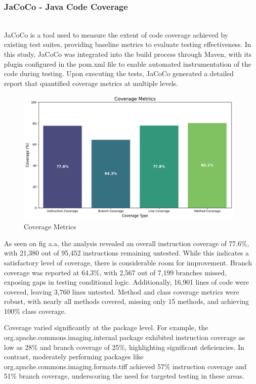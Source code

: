 \documentclass[sigconf]{acmart}
\begin{document}
\subsubsection{JaCoCo - Java Code Coverage}
\hfill\\
JaCoCo is a tool used to measure the extent of code coverage achieved by existing test suites, providing baseline metrics to evaluate testing effectiveness. In this study, JaCoCo was integrated into the build process through Maven, with its plugin configured in the pom.xml file to enable automated instrumentation of the code during testing. Upon executing the tests, JaCoCo generated a detailed report that quantified coverage metrics at multiple levels.

\begin{figure}[h!]
    \centering
    \includegraphics[width=1\linewidth]{Coverage_Metrics.png}
    \caption{Coverage Metrics}
    \label{fig:enter-label}
\end{figure}

As seen on fig a.a, the analysis revealed an overall instruction coverage of 77.6\%, with 21,380 out of 95,452 instructions remaining untested. While this indicates a satisfactory level of coverage, there is considerable room for improvement. Branch coverage was reported at 64.3\%, with 2,567 out of 7,199 branches missed, exposing gaps in testing conditional logic. Additionally, 16,901 lines of code were covered, leaving 3,760 lines untested. Method and class coverage metrics were robust, with nearly all methods covered, missing only 15 methods, and achieving 100\% class coverage.

Coverage varied significantly at the package level. For example, the org.apache.commons.imaging.internal package exhibited instruction coverage as low as 28\% and branch coverage of 25\%, highlighting significant deficiencies. In contrast, moderately performing packages like org.apache.commons.imaging.formats.tiff achieved 57\% instruction coverage and 51\% branch coverage, underscoring the need for targeted testing in these areas.
\end{document}
